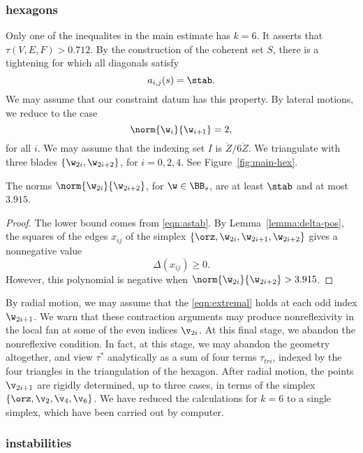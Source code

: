 \subsubsection{hexagons}

Only one of the inequalites in the main estimate has $k=6$.  It
asserts that $\tau(V,E,F) > 0.712$.  By the construction of the
coherent set $S$, there is a tightening for which all diagonals
satisfy
\begin{equation}\label{eqn:astab}
a_{i,j}(s)=\stab.
\end{equation}  
We may assume that our constraint datum
has this property.
By lateral motions, we reduce to the case
\[
\norm{\w_i}{\w_{i+1}}=2,
\]
for all $i$.  We may assume that the indexing set $I$ is $\ring{Z}/{6\ring{Z}}$. 
We triangulate with three blades
$\{\w_{2i},\w_{2i+2}\}$, for $i=0,2,4$.  See Figure~\ref{fig:main-hex}.

\figARTLHOI %

\begin{lemma}
The norms $\norm{\w_{2i}}{\w_{2i+2}}$, for $\w\in \BB_s$, 
are at least $\stab$ and at most $3.915$.
\end{lemma}

\begin{proof}
  The lower bound comes from \eqref{eqn:astab}.  By
  Lemma~\ref{lemma:delta-pos}, the squares of the edges $x_{ij}$ of
  the simplex $\{\orz,\w_{2i},\w_{2i+1},\w_{2i+2}\}$ gives a
  nonnegative value
\[
\Delta(x_{ij})\ge 0.
\]
However, this polynomial is  negative when
$\norm{\w_{2i}}{\w_{2i+2}} > 3.915$.
\end{proof}

By radial motion, we may assume that the \eqref{eqn:extremal} holds at
each odd index $\w_{2i+1}$.  We warn that these contraction arguments
may produce nonreflexivity in the local fan at some of the even
indices $\v_{2i}$.  At this final stage, we abandon the nonreflexive
condition.  In fact, at this stage, we may abandon the geometry
altogether, and view $\tau^*$ analytically as a sum of four terms
$\tau_{tri}$, indexed by the four triangles in the triangulation of
the hexagon.  After radial motion, the points $\v_{2i+1}$ are rigidly
determined, up to three cases, in terms of the simplex
$\{\orz,\v_2,\v_4,\v_6\}$.  We have reduced the calculations for $k=6$
to a single simplex, which have been carried out by computer.

\subsubsection{instabilities}

